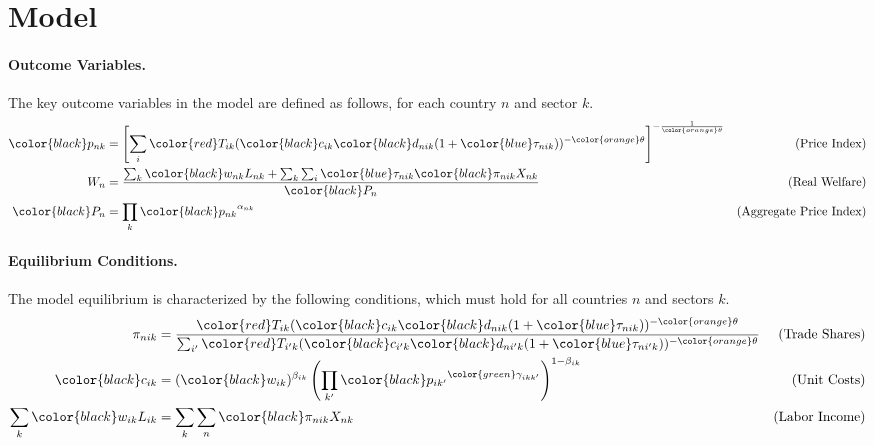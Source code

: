 

\section{Model}
\paragraph{Outcome Variables.} The key outcome variables in the model are defined as follows, for each country $n$ and sector $k$.
\begin{align*}
    {\color{black}p_{nk}} &= \left[ \sum_{i} {\color{red}T_{ik}} ({\color{black}c_{ik}} {\color{black}d_{nik}} (1 + {\color{blue}\tau_{nik}}))^{-{\color{orange}\theta}} \right]^{-\frac{1}{{\color{orange}\theta}}} & \text{(Price Index)} \\
    W_n &= \frac{\sum_{k} {\color{black}w_{nk}} L_{nk} + \sum_{k} \sum_{i} {\color{blue}\tau_{nik}} {\color{black}\pi_{nik}} X_{nk}}{{\color{black}P_n}} & \text{(Real Welfare)} \\
    {\color{black}P_n} &= \prod_{k} {\color{black}p_{nk}}^{\alpha_{nk}} & \text{(Aggregate Price Index)}
\end{align*}

\paragraph{Equilibrium Conditions.} The model equilibrium is characterized by the following conditions, which must hold for all countries $n$ and sectors $k$.
\begin{align*}
    \pi_{nik} &= \frac{{\color{red}T_{ik}} ({\color{black}c_{ik}} {\color{black}d_{nik}} (1 + {\color{blue}\tau_{nik}}))^{-{\color{orange}\theta}}}{\sum_{i'} {\color{red}T_{i'k}} ({\color{black}c_{i'k}} {\color{black}d_{ni'k}} (1 + {\color{blue}\tau_{ni'k}}))^{-{\color{orange}\theta}}} & \text{(Trade Shares)} \\
    {\color{black}c_{ik}} &= ({\color{black}w_{ik}})^{\beta_{ik}} \left(\prod_{k'} {\color{black}p_{ik'}}^{{\color{green}\gamma_{ikk'}}}\right)^{1 - \beta_{ik}} & \text{(Unit Costs)} \\
   \sum_{k} {\color{black}w_{ik}} L_{ik} &= \sum_{k} \sum_{n} {\color{black}\pi_{nik}} X_{nk} & \text{(Labor Income)}
\end{align*}
